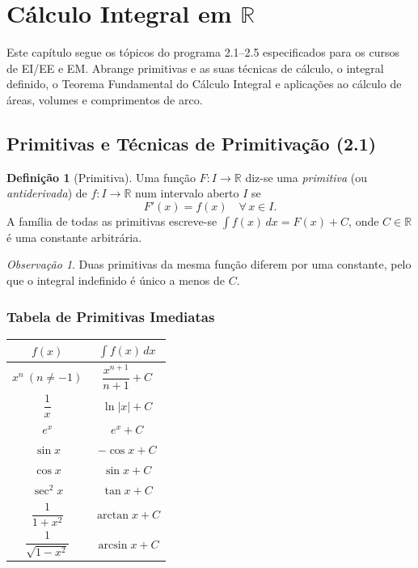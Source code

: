 \documentclass[12pt,a4paper]{article}
\theoremstyle{definition}
\newtheorem{definition}[theorem]{Definição}
\theoremstyle{remark}
\newtheorem{remark}[theorem]{Observação}
\begin{document}
\tableofcontents
\newpage

\section{Cálculo Integral em \texorpdfstring{$\mathbb{R}$}{R}}

Este capítulo segue os tópicos do programa 2.1--2.5 especificados para os
cursos de EI/EE e EM. Abrange primitivas e as suas técnicas de cálculo,
o integral definido, o Teorema Fundamental do Cálculo Integral e
aplicações ao cálculo de áreas, volumes e comprimentos de arco.

\subsection{Primitivas e Técnicas de Primitivação (2.1)}

\begin{definition}[Primitiva]
  Uma função $F : I \to \mathbb{R}$ diz-se uma \emph{primitiva} (ou
  \emph{antiderivada}) de $f : I \to \mathbb{R}$ num intervalo aberto $I$ se
  \[
    F'(x) = f(x) \quad \forall\, x \in I.
  \]
  A família de todas as primitivas escreve-se $\displaystyle\int f(x)\,dx = F(x)+C$,
  onde $C \in \mathbb{R}$ é uma constante arbitrária.
\end{definition}

\begin{remark}
  Duas primitivas da mesma função diferem por uma constante, pelo que o
  integral indefinido é único a menos de $C$.
\end{remark}

\subsubsection*{Tabela de Primitivas Imediatas}

\begin{center}
\begin{tabular}{cc}
  \toprule
  $f(x)$ & $\displaystyle\int f(x)\,dx$ \\
  \midrule
  $x^n\ (n\neq-1)$ & $\dfrac{x^{n+1}}{n+1}+C$ \\[6pt]
  $\dfrac{1}{x}$ & $\ln|x|+C$ \\[6pt]
  $e^x$ & $e^x+C$ \\[6pt]
  $\sin x$ & $-\cos x+C$ \\[6pt]
  $\cos x$ & $\sin x+C$ \\[6pt]
  $\sec^2 x$ & $\tan x+C$ \\[6pt]
  $\dfrac{1}{1+x^2}$ & $\arctan x + C$ \\[6pt]
  $\dfrac{1}{\sqrt{1-x^2}}$ & $\arcsin x + C$ \\
  \bottomrule
\end{tabular}
\end{center}
\end{document}
